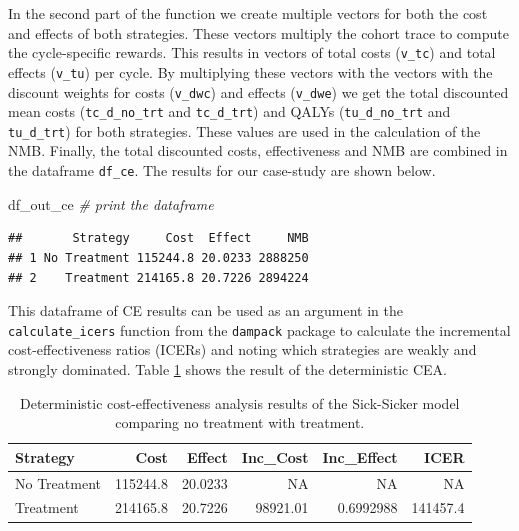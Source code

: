 \documentclass[]{book}
\newenvironment{Shaded}{\begin{snugshade}}{\end{snugshade}}
\newcommand{\CommentTok}[1]{\textcolor[rgb]{0.56,0.35,0.01}{\textit{#1}}}
\newcommand{\DataTypeTok}[1]{\textcolor[rgb]{0.13,0.29,0.53}{#1}}
\newcommand{\KeywordTok}[1]{\textcolor[rgb]{0.13,0.29,0.53}{\textbf{#1}}}
\newcommand{\NormalTok}[1]{#1}
\newcommand{\OperatorTok}[1]{\textcolor[rgb]{0.81,0.36,0.00}{\textbf{#1}}}
\newcommand{\StringTok}[1]{\textcolor[rgb]{0.31,0.60,0.02}{#1}}
\begin{document}
In the second part of the function we create multiple vectors for both the cost and effects of both strategies. These vectors multiply the cohort trace to compute the cycle-specific rewards. This results in vectors of total costs (\texttt{v\_tc}) and total effects (\texttt{v\_tu}) per cycle. By multiplying these vectors with the vectors with the discount weights for costs (\texttt{v\_dwc}) and effects (\texttt{v\_dwe}) we get the total discounted mean costs (\texttt{tc\_d\_no\_trt} and \texttt{tc\_d\_trt}) and QALYs (\texttt{tu\_d\_no\_trt} and \texttt{tu\_d\_trt}) for both strategies. These values are used in the calculation of the NMB. Finally, the total discounted costs, effectiveness and NMB are combined in the dataframe \texttt{df\_ce}. The results for our case-study are shown below.

\begin{Shaded}
\begin{Highlighting}[]
\NormalTok{df_out_ce }\CommentTok{# print the dataframe }
\end{Highlighting}
\end{Shaded}

\begin{verbatim}
##       Strategy     Cost  Effect     NMB
## 1 No Treatment 115244.8 20.0233 2888250
## 2    Treatment 214165.8 20.7226 2894224
\end{verbatim}

This dataframe of CE results can be used as an argument in the \texttt{calculate\_icers} function from the \texttt{dampack} package to calculate the incremental cost-effectiveness ratios (ICERs) and noting which strategies are weakly and strongly dominated. Table \ref{tab:df-cea-det} shows the result of the deterministic CEA.

\begin{Shaded}
\end{Shaded}

\begin{table}[t]

\caption{\label{tab:df-cea-det}Deterministic cost-effectiveness analysis results of the Sick-Sicker model comparing no treatment with treatment.}
\centering
\begin{tabular}{l|r|r|r|r|r}
\hline
Strategy & Cost & Effect & Inc\_Cost & Inc\_Effect & ICER\\
\hline
No Treatment & 115244.8 & 20.0233 & NA & NA & NA\\
\hline
Treatment & 214165.8 & 20.7226 & 98921.01 & 0.6992988 & 141457.4\\
\hline
\end{tabular}
\end{table}
\end{document}
